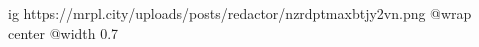  
 
 
 
 

\ifcmt
  ig https://mrpl.city/uploads/posts/redactor/nzrdptmaxbtjy2vn.png
  @wrap center
  @width 0.7
\fi
